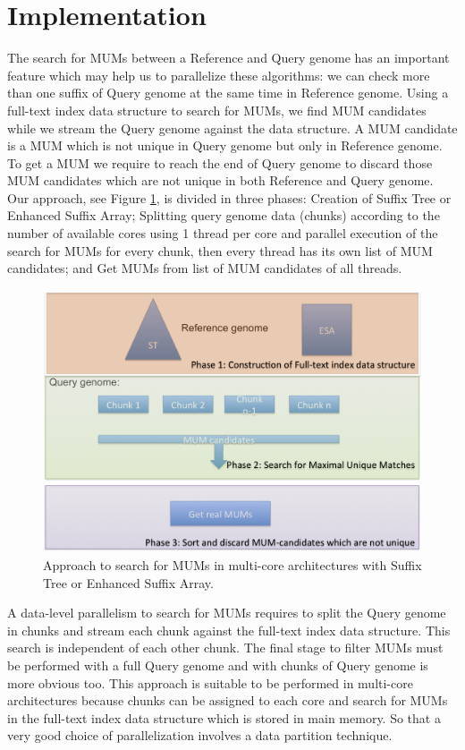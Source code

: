 \documentclass[runningheads,a4paper]{llncs}
\begin{document}
\section{Implementation}
The search for MUMs between a Reference and Query genome has an important feature which may help us to parallelize these algorithms: we can check more than one suffix of Query genome at the same time in Reference genome. Using a full-text index data structure to search for MUMs, we find MUM candidates while we stream the Query genome against the data structure. A MUM candidate is a MUM which is not unique in Query genome but only in Reference genome. To get a MUM we require to reach the end of Query genome to discard those MUM candidates which are not unique in both Reference and Query genome. Our approach, see Figure \ref{phases}, is divided in three phases: Creation of Suffix Tree or Enhanced Suffix Array; Splitting query genome data (chunks) according to the number of available cores using 1 thread per core and parallel execution of the search for MUMs for every chunk, then every thread has its own list of MUM candidates; and Get MUMs from list of MUM candidates of all threads. 
\begin{figure}[H] 
\centering 
\includegraphics[scale=0.5]{phases.png}
\caption{Approach to search for MUMs in multi-core architectures with Suffix Tree or Enhanced Suffix Array.}
  \label{phases}
\end{figure}
A data-level parallelism to search for MUMs requires to split the Query genome in chunks and stream each chunk against the full-text index data structure. This search is independent of each other chunk. The final stage to filter MUMs must be performed with a full Query genome and with chunks of Query genome is more obvious too. This approach is suitable to be performed in multi-core architectures because chunks can be assigned to each core and search for MUMs in the full-text index data structure which is stored in main memory. So that a very good choice of parallelization involves a data partition technique.
\end{document}
